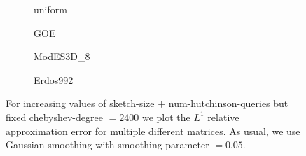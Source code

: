 \begin{figure}[ht]
    \centering
    \begin{subfigure}[b]{0.49\columnwidth}
        
        \caption{uniform}
        \label{fig:5-experiments-multi-matrix-convergence-uniform}
    \end{subfigure}
    \begin{subfigure}[b]{0.49\columnwidth}
        
        \caption{GOE}
        \label{fig:5-experiments-multi-matrix-convergence-goe}
    \end{subfigure}
    \begin{subfigure}[b]{0.49\columnwidth}
        
        \caption{ModES3D\_8}
        \label{fig:5-experiments-multi-matrix-convergence-ModES3D}
    \end{subfigure}
    \begin{subfigure}[b]{0.49\columnwidth}
        
        \caption{Erdos992}
        \label{fig:5-experiments-multi-matrix-convergence-Erdos}
    \end{subfigure}
    \caption{For increasing values of \gls{sketch-size} $+$ \gls{num-hutchinson-queries}
    but fixed \gls{chebyshev-degree} $=2400$ we plot the $L^1$ relative approximation error 
    for multiple different matrices. As usual, we use
    Gaussian smoothing with \gls{smoothing-parameter} $=0.05$.}
    \label{fig:5-experiments-multi-matrix-convergence}
\end{figure}

